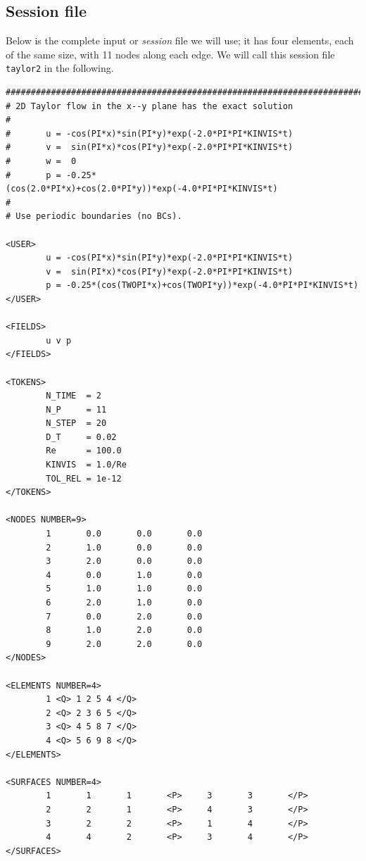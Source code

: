 \documentclass[11pt]{report}
\begin{document}
\subsection{Session file}

Below is the complete input or \emph{session} file we will use; it
has four elements, each of the same size, with 11 nodes along each
edge.  We will call this session file \texttt{taylor2} in the
following.

{\small
\begin{verbatim}
##############################################################################
# 2D Taylor flow in the x--y plane has the exact solution
#
#       u = -cos(PI*x)*sin(PI*y)*exp(-2.0*PI*PI*KINVIS*t)
#       v =  sin(PI*x)*cos(PI*y)*exp(-2.0*PI*PI*KINVIS*t)
#       w =  0
#       p = -0.25*(cos(2.0*PI*x)+cos(2.0*PI*y))*exp(-4.0*PI*PI*KINVIS*t)
#
# Use periodic boundaries (no BCs).

<USER>
        u = -cos(PI*x)*sin(PI*y)*exp(-2.0*PI*PI*KINVIS*t)
        v =  sin(PI*x)*cos(PI*y)*exp(-2.0*PI*PI*KINVIS*t)
        p = -0.25*(cos(TWOPI*x)+cos(TWOPI*y))*exp(-4.0*PI*PI*KINVIS*t)
</USER>

<FIELDS>
        u v p
</FIELDS>

<TOKENS>
        N_TIME  = 2
        N_P     = 11
        N_STEP  = 20
        D_T     = 0.02
        Re      = 100.0
        KINVIS  = 1.0/Re
        TOL_REL = 1e-12
</TOKENS>

<NODES NUMBER=9>
        1       0.0       0.0       0.0
        2       1.0       0.0       0.0
        3       2.0       0.0       0.0
        4       0.0       1.0       0.0
        5       1.0       1.0       0.0
        6       2.0       1.0       0.0
        7       0.0       2.0       0.0
        8       1.0       2.0       0.0
        9       2.0       2.0       0.0
</NODES>

<ELEMENTS NUMBER=4>
        1 <Q> 1 2 5 4 </Q>
        2 <Q> 2 3 6 5 </Q>
        3 <Q> 4 5 8 7 </Q>
        4 <Q> 5 6 9 8 </Q>
</ELEMENTS>

<SURFACES NUMBER=4>
        1       1       1       <P>     3       3       </P>
        2       2       1       <P>     4       3       </P>
        3       2       2       <P>     1       4       </P>
        4       4       2       <P>     3       4       </P>
</SURFACES>
\end{verbatim}
}
\end{document}
